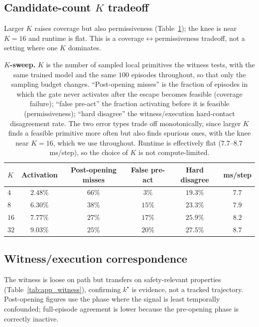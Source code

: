 \subsection{Candidate-count $K$ tradeoff}
\label{app:k_sweep}
Larger $K$ raises coverage but also permissiveness
(Table~\ref{tab:app_ksweep}); the knee is near $K{=}16$ and runtime is flat.
This is a coverage$\leftrightarrow$permissiveness tradeoff, not a setting where
one $K$ dominates.

\begin{table}[htbp]
\centering
\caption{\textbf{$K$-sweep.} $K$ is the number of sampled local primitives the witness
tests, with the same trained model and the same $100$ episodes throughout, so that
only the sampling budget changes. ``Post-opening misses'' is the fraction of
episodes in which the gate never activates after the escape becomes feasible
(coverage failure); ``false pre-act'' the fraction activating before it is
feasible (permissiveness); ``hard disagree'' the witness/execution
hard-contact disagreement rate. The two error types trade off monotonically, since
larger $K$ finds a feasible primitive more often but also finds spurious ones, with the knee near $K{=}16$, which we use throughout. Runtime is
effectively flat ($7.7$--$8.7$\,ms/step), so the choice of $K$ is not
compute-limited.}
\label{tab:app_ksweep}
\small\setlength{\tabcolsep}{6pt}\renewcommand{\arraystretch}{1.1}
\begin{tabular}{lccccc}
\toprule
$K$ & Activation & Post-opening misses & False pre-act & Hard disagree & ms/step \\
\midrule
$4$  & $2.48\%$ & $66\%$ & $3\%$  & $19.3\%$ & $7.7$ \\
$8$  & $6.30\%$ & $38\%$ & $15\%$ & $23.3\%$ & $7.9$ \\
$16$ & $7.77\%$ & $27\%$ & $17\%$ & $25.9\%$ & $8.2$ \\
$32$ & $9.03\%$ & $25\%$ & $20\%$ & $27.5\%$ & $8.7$ \\
\bottomrule
\end{tabular}
\end{table}

\subsection{Witness/execution correspondence}
\label{app:witness}
The witness is loose on path but transfers on safety-relevant properties
(Table~\ref{tab:app_witness}), confirming $k^\star$ is evidence, not a tracked
trajectory. Post-opening figures use the phase where the signal is least
temporally confounded; full-episode agreement is lower because the pre-opening
phase is correctly inactive.

